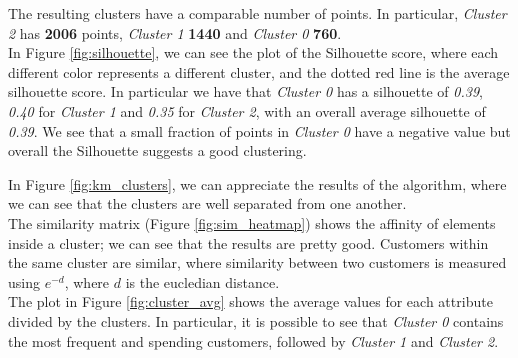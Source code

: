 The resulting clusters have a comparable number of points. In particular, \emph{Cluster 2} has \textbf{2006} points, \emph{Cluster 1} \textbf{1440} and \emph{Cluster 0} \textbf{760}.\\
In Figure \ref{fig:silhouette}, we can see the plot of the Silhouette score, where each different color represents a different cluster, and the dotted red line is the average silhouette score. In particular we have that \emph{Cluster 0} has a silhouette of \emph{0.39}, \emph{0.40} for \emph{Cluster 1} and \emph{0.35} for \emph{Cluster 2}, with an overall average silhouette of \emph{0.39}. We see that a small fraction of points in \emph{Cluster 0} have a negative value but overall the Silhouette suggests a good clustering.

In Figure \ref{fig:km_clusters}, we can appreciate the results of the algorithm, where we can see that the clusters are well separated from one another.\\
The similarity matrix (Figure \ref{fig:sim_heatmap}) shows the affinity of elements inside a cluster; we can see that the results are pretty good. Customers within the same cluster are similar, where similarity between two customers is measured using $e^{-d}$, where $d$ is the eucledian distance.\\
The plot in Figure \ref{fig:cluster_avg} shows the average values for each attribute divided by the clusters. In particular, it is possible to see that \emph{Cluster 0} contains the most frequent and spending customers, followed by \emph{Cluster 1} and \emph{Cluster 2}.

